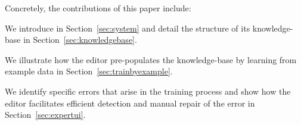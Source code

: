 Concretely, the contributions of this paper include:
\begin{enumerate*}
  \item We introduce \systemname in Section~\ref{sec:system} and detail the structure of its knowledge-base in Section~\ref{sec:knowledgebase}.
  \item We illustrate how the \systemname editor pre-populates the knowledge-base by learning from example data in Section~\ref{sec:trainbyexample}.
  \item We identify specific errors that arise in the training process and show how the \systemname editor facilitates efficient detection and manual repair of the error in Section~\ref{sec:expertui}.
\end{enumerate*}






